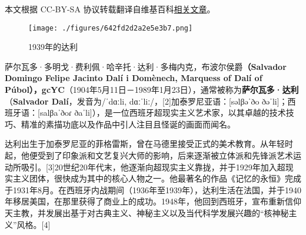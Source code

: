 
本文根据 CC-BY-SA 协议转载翻译自维基百科\href{https://en.wikipedia.org/wiki/Salvador_Dal\%C3\%AD}{相关文章}。
\begin{figure}[ht]
\centering
\texttt{[image: ./figures/642fd2d2a2e5e3b7.png]}
\caption{1939年的达利} \label{fig_SRWD_1}
\end{figure}
萨尔瓦多·多明戈·费利佩·哈辛托·达利·多梅内克，布波尔侯爵\textbf{（Salvador Domingo Felipe Jacinto Dalí i Domènech, Marquess of Dalí of Púbol），gcYC}（1904年5月11日－1989年1月23日），通常被称为\textbf{萨尔瓦多·达利}（\textbf{Salvador Dalí}，发音为/ˈdɑːli, dɑːˈliː/，[2]加泰罗尼亚语：[səlβəˈðo ðəˈli]；西班牙语：[salβaˈðoɾ ðaˈli]），是一位西班牙超现实主义艺术家，以其卓越的技术技巧、精准的素描功底以及作品中引人注目且怪诞的画面而闻名。

达利出生于加泰罗尼亚的菲格雷斯，曾在马德里接受正式的美术教育。从年轻时起，他便受到了印象派和文艺复兴大师的影响，后来逐渐被立体派和先锋派艺术运动所吸引。[3]20世纪20年代末，他逐渐向超现实主义靠拢，并于1929年加入超现实主义团体，很快成为其中的核心人物之一。他最著名的作品《记忆的永恒》完成于1931年8月。在西班牙内战期间（1936年至1939年），达利生活在法国，并于1940年移居美国，在那里获得了商业上的成功。1948年，他回到西班牙，宣布重新信仰天主教，并发展出基于对古典主义、神秘主义以及当代科学发展兴趣的“核神秘主义”风格。[4]